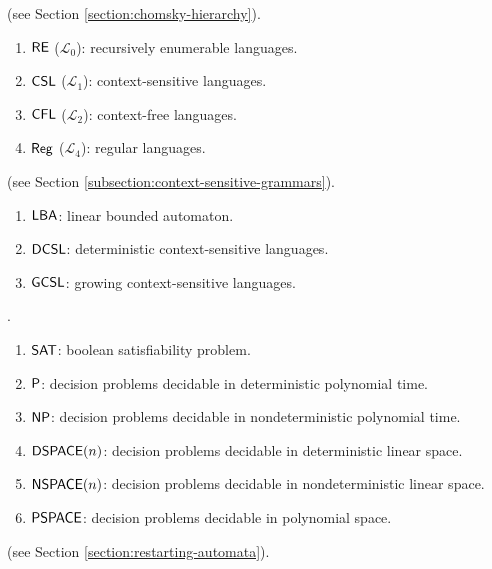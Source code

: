  (see Section \ref{section:chomsky-hierarchy}).

\begin{enumerate}[]
\item $\textup{\sf RE}$ ($\mathcal{L}_0$): recursively enumerable languages.
\item $\textup{\sf CSL}$ ($\mathcal{L}_1$): context-sensitive languages.
\item $\textup{\sf CFL}$ ($\mathcal{L}_2$): context-free languages.
\item $\textup{\sf Reg}$ ($\mathcal{L}_4$): regular languages.
\end{enumerate}

 (see Section \ref{subsection:context-sensitive-grammars}).

\begin{enumerate}[]
\item $\textup{\sf LBA}$: linear bounded automaton.
\item $\textup{\sf DCSL}$: deterministic context-sensitive languages.
\item $\textup{\sf GCSL}$: growing context-sensitive languages.
\end{enumerate}

.

\begin{enumerate}[]
\item $\textup{\sf SAT}$: boolean satisfiability problem.
\item $\textup{\sf P}$: decision problems decidable in deterministic polynomial time.
\item $\textup{\sf NP}$: decision problems decidable in nondeterministic polynomial time.
\item $\textup{\sf DSPACE}(n)$: decision problems decidable in deterministic linear space.
\item $\textup{\sf NSPACE}(n)$: decision problems decidable in nondeterministic linear space.
\item $\textup{\sf PSPACE}$: decision problems decidable in polynomial space.
\end{enumerate}

 (see Section \ref{section:restarting-automata}).


